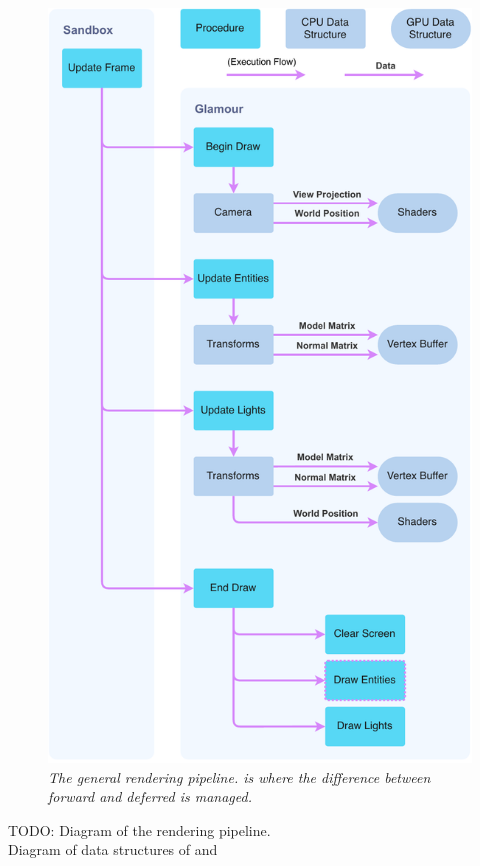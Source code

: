 \begin{multicols}{2}
  \begin{figure}[H]
    \includegraphics[width=1\columnwidth]{../rendering-pipeline.pdf}
    \caption[Rendering pipeline]{
      \emph{
        The general rendering pipeline.
         is where the difference between forward and deferred is managed.
      }
    }\label{fig:rendering-pipeline}
  \end{figure}

  TODO: Diagram of the rendering pipeline.\\
  Diagram of data structures of  and 


\end{multicols}
